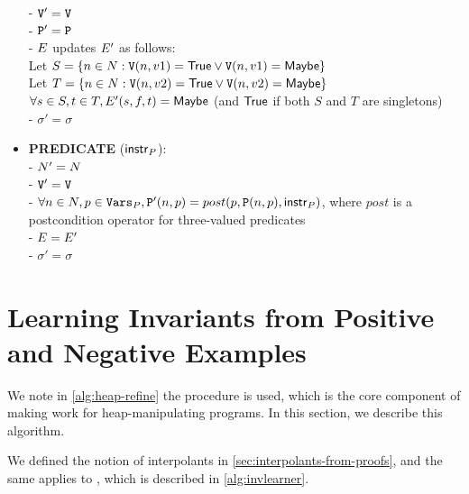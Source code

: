 \begin{itemize}
    - $\mathtt{V}' = \mathtt{V}$ \\
    - $\mathtt{P}' = \mathtt{P}$ \\
    - $E$ updates $E'$ as follows: \\
      \hspace*{1em} Let $S = \{n \in N : \mathtt{V}(n, v1) = \mathsf{True} \vee \mathtt{V}(n, v1) = \mathsf{Maybe}\}$ \\
      \hspace*{1em} Let $T = \{n \in N : \mathtt{V}(n, v2) = \mathsf{True} \vee \mathtt{V}(n, v2) = \mathsf{Maybe}\}$ \\
      \hspace*{1em} $\forall s \in S, t \in T, E'(s,f,t) = \mathsf{Maybe}$ (and $\mathsf{True}$ if both $S$ and $T$ are singletons) \\
    - $\sigma' = \sigma$
  \item \textbf{PREDICATE} ($\mathsf{instr}_P$): \\
    - $N' = N$ \\
    - $\mathtt{V}' = \mathtt{V}$ \\
    - $\forall n \in N, p \in \mathtt{Vars}_P, \mathtt{P}'(n,p) = post(p, \mathtt{P}(n,p), \mathsf{instr}_P)$, where $post$ is a postcondition operator for three-valued predicates \\
    - $E = E'$ \\
    - $\sigma' = \sigma$
\end{itemize}

\section{Learning Invariants from Positive and Negative Examples}

We note in \autoref{alg:heap-refine} the procedure \seplearner is used, which is the core component of making \impact work for heap-manipulating programs. In this section, we describe this algorithm.

We defined the notion of interpolants in \autoref{sec:interpolants-from-proofs}, and the same applies to \seplearner, which is described in \autoref{alg:invlearner}.

